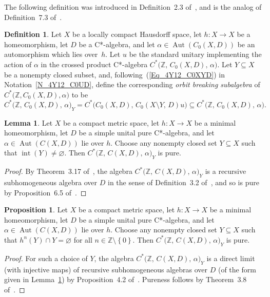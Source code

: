 \documentclass[10pt]{amsart}
\numberwithin{equation}{section}
\theoremstyle{definition}
\newtheorem{lem}[thm]{Lemma}
\newtheorem{prp}[thm]{Proposition}
\newtheorem{dfn}[thm]{Definition}
\newcommand{\af}{\alpha}
\newcommand{\Z}{{\mathbb{Z}}}
\newcommand{\sint}{{\operatorname{int}}}
\newcommand{\Aut}{{\operatorname{Aut}}}
\newcommand{\ca}{C*-algebra}
\newcommand{\chs}{compact Hausdorff space}
\newcommand{\hme}{homeomorphism}
\newcommand{\set}[1]{\left\{ #1 \right\}}
\begin{document}
The following definition was introduced in Definition~2.3
of~\cite{ArBcPh2}, and is the analog of
Definition~7.3 of~\cite{Phl40}.

\begin{dfn}\label{D_1_OrbSubalg}
Let $X$ be a locally \chs,
let $h \colon X \to X$ be a \hme,
let $D$ be a \ca,
and let $\af \in \Aut ( C_0 (X, D))$
be an automorphism which lies over~$h$.
Let $u$ be
the standard unitary implementing the action of
$\af$ in the crossed product C*-algebra
$C^* \bigl( \Z, \, C_0 (X, D), \, \af \bigr)$.
Let $Y \subseteq X$ be a nonempty closed subset,
and, following~(\ref{Eq_4Y12_C0XYD}) in
Notation~\ref{N_4Y12_C0UD}, define the
corresponding {\emph{orbit breaking subalgebra}} of
$C^* \big( \Z,  C_0 (X, D), \af \big)$ to be
\[
C^* \big( \Z, \, C_0 (X, D), \, \af \big)_Y
= C^* \big(  C_0 (X, D), \, C_0 (X \setminus Y, \, D) u \big)
\subseteq C^* \big( \Z, \, C_0 (X, D), \, \af \big).
\]
\end{dfn}

\begin{lem}\label{L_2_OrbBreakPure}
Let $X$ be a compact metric space, let $h \colon X \to X$ be a
minimal homeomorphism, let $D$ be a simple unital pure C*-algebra,
and let $\af \in \Aut (C (X,D))$ lie over $h$.
Choose any nonempty
closed set $Y \subseteq X$ such that $\sint(Y) \neq \varnothing$.
Then
$C^* \bigl( \Z, \, C (X, D), \, \af \bigr)_{Y}$ is pure.
\end{lem}

\begin{proof}
By Theorem~3.17 of~\cite{ArBcPh2}, the algebra
$C^* \bigl( \Z, \, C (X, D), \, \af \bigr)_{Y}$ is a
recursive subhomogeneous algebra over $D$ in the sense of
Definition~3.2 of~\cite{ArBcPh2}, and so is pure by
Proposition~6.5 of~\cite{SethVil}.
\end{proof}

\begin{prp}\label{P_3_ApproxSubPure}
Let $X$ be a compact metric space, let $h \colon X \to X$ be a
minimal homeomorphism, let $D$ be a simple unital pure C*-algebra,
and let $\af \in \Aut (C (X,D))$ lie over $h$.
Choose any nonempty
closed set $Y \subseteq X$ such that $h^{n} (Y) \cap Y = \varnothing$
for all $n \in \Z \setminus \set{0}$.
Then
$C^* \bigl( \Z, \, C (X, D), \, \af \bigr)_{Y}$ is pure.
\end{prp}

\begin{proof}
For such a choice of $Y$, the algebra
$C^* \bigl( \Z, \, C (X, D), \, \af \bigr)_{Y}$ is a
direct limit (with injective maps) of recursive subhomogeneous
algebras over $D$ (of the form given in
Lemma~\ref{L_2_OrbBreakPure}) by
Proposition~4.2 of~\cite{ArBcPh2}.
Pureness follows by
Theorem~3.8 of~\cite{PerThiVil}.
\end{proof}
\end{document}
